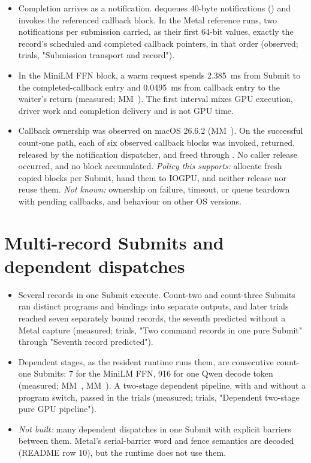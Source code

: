 \begin{itemize}
\item Completion arrives as a notification.  dequeues
  40-byte notifications () and invokes the referenced callback block. In the Metal reference runs,
  two notifications per submission carried, as their first 64-bit values, exactly the record's scheduled and completed
  callback pointers, in that order (observed; trials, "Submission transport and record").
\item In the MiniLM FFN block, a warm request spends 2.385~ms from Submit to the completed-callback entry and 0.0495~ms
  from callback entry to the waiter's return (measured; MM~). The first interval mixes GPU
  execution, driver work and completion delivery and is not GPU time.
\item Callback ownership was observed on macOS 26.6.2 (MM~). On the successful count-one path, each of six observed callback
  blocks was invoked, returned, released by the notification dispatcher, and freed through . No caller
  release occurred, and no block accumulated. \emph{Policy this supports:} allocate fresh copied blocks per Submit, hand them
  to IOGPU, and neither release nor reuse them. \emph{Not known:} ownership on failure, timeout, or queue teardown with
  pending callbacks, and behaviour on other OS versions.
\end{itemize}

\section{Multi-record Submits and dependent dispatches}\label{sec:several-records-per}

\begin{itemize}
\item Several records in one Submit execute. Count-two and count-three Submits ran distinct programs and bindings into
  separate outputs, and later trials reached seven separately bound records, the seventh predicted without a Metal
  capture (measured; trials, "Two command records in one pure Submit" through "Seventh record predicted").
\item Dependent stages, as the resident runtime runs them, are consecutive count-one Submits: 7 for the MiniLM FFN, 916
  for one Qwen decode token (measured; MM~, MM~). A two-stage dependent pipeline, with and without a
  program switch, passed in the trials (measured; trials, "Dependent two-stage pure GPU pipeline").
\item \emph{Not built:} many dependent dispatches in one Submit with explicit barriers between them. Metal's serial-barrier word
  and fence semantics are decoded (README row 10), but the runtime does not use them.
\end{itemize}

